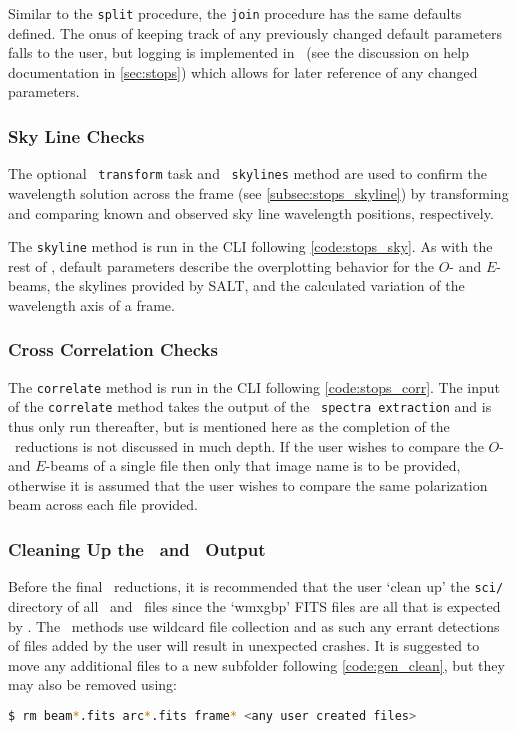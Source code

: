 Similar to the \texttt{split} procedure, the \texttt{join} procedure has the same defaults defined.
The onus of keeping track of any previously changed default parameters falls to the user, but logging is implemented in \stops\ (see the discussion on help documentation in \autoref{sec:stops}) which allows for later reference of any changed parameters.

\subsubsection{Sky Line Checks} \label{subsec:reduc_sky}

The optional \iraf\ \texttt{transform} task and \stops\ \texttt{skylines} method are used to confirm the wavelength solution across the frame (see \autoref{subsec:stops_skyline}) by transforming and comparing known and observed sky line wavelength positions, respectively.

The \texttt{skyline} method is run in the \gls{CLI} following \autoref{code:stops_sky}.
As with the rest of \stops, default parameters describe the overplotting behavior for the $O$- and $E$-beams, the skylines provided by \gls{SALT}, and the calculated variation of the wavelength axis of a frame.

\subsubsection{Cross Correlation Checks} \label{subsec:reduc_corr}

The \texttt{correlate} method is run in the \gls{CLI} following \autoref{code:stops_corr}.
The input of the \texttt{correlate} method takes the output of the \polsalt\ \texttt{spectra extraction} and is thus only run thereafter, but is mentioned here as the completion of the \polsalt\ reductions is not discussed in much depth.
If the user wishes to compare the $O$- and $E$-beams of a single file then only that image name is to be provided, otherwise it is assumed that the user wishes to compare the same polarization beam across each file provided.

\subsubsection{Cleaning Up the \iraf\ and \stops\ Output}

Before the final \polsalt\ reductions, it is recommended that the user `clean up' the \texttt{sci/} directory of all \iraf\ and \stops\ files since the `wmxgbp' \gls{FITS} files are all that is expected by \polsalt.
The \polsalt\ methods use wildcard file collection and as such any errant detections of files added by the user will result in unexpected crashes.
It is suggested to move any additional files to a new subfolder following \autoref{code:gen_clean}, but they may also be removed using:
\begin{lstlisting}[language=bash]
$ rm beam*.fits arc*.fits frame* <any user created files>
\end{lstlisting}

